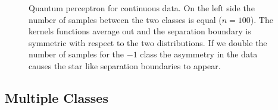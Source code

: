 \begin{figure}[htb!]
    \centering
        \caption{Quantum perceptron for continuous data. On the left side the number of samples between the two classes is equal ($n=100$). The kernels functions average out and the separation boundary is symmetric with respect to the two distributions. If we double the number of samples for the $-1$ class the asymmetry in the data causes the star like separation boundaries to appear.}
    \label{fig:boundary_cont}
\end{figure}

\clearpage
\subsection{Multiple Classes}

